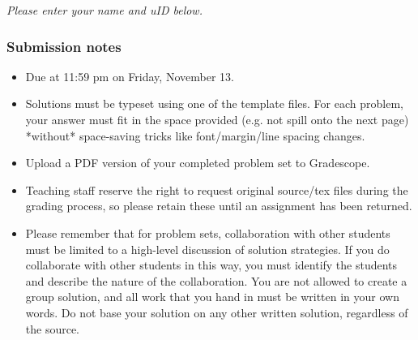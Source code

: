 \documentclass{article}
\begin{document}
{\it Please enter your name and uID below.}

\vspace{3em}

\par
{}
\par

\vfill

\subsubsection*{Submission notes}
\begin{itemize}
  \item Due at 11:59 pm on Friday, November 13.
  \item Solutions must be typeset using one of the template files. For each problem, your answer must fit
    in the space provided (e.g. not spill onto the next page) *without* space-saving tricks
    like font/margin/line spacing changes.
  \item Upload a PDF version of your completed problem set to Gradescope.
  \item Teaching staff reserve the right to request original source/tex files during the grading process, so please retain these until an assignment has been returned.
  \item Please remember that for problem sets, collaboration with other students must be limited to a high-level discussion of solution strategies. If you do collaborate with other students in this way, you must identify the students and describe the nature of the collaboration. You are not allowed to create a group solution, and all work that you hand in must be written in your own words. Do not base your solution on any other written solution, regardless of the source.
\end{itemize}

\pagebreak
\end{document}
